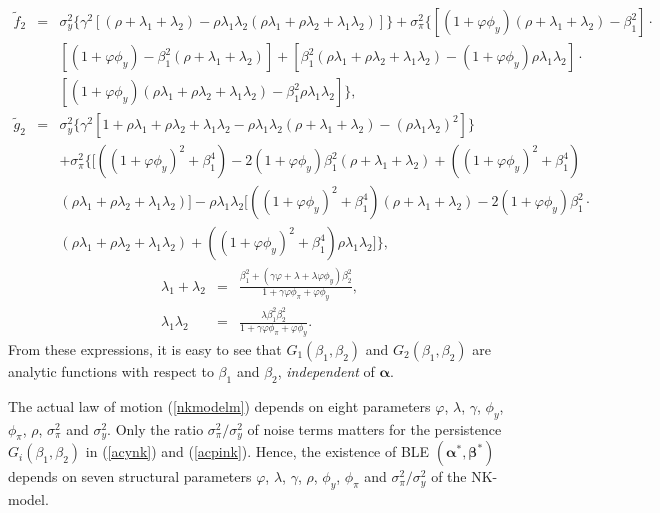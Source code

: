 \begin{eqnarray}
\widetilde{f}_2&=&\sigma_y^2\Big\{\gamma^2[(\rho+\lambda_1+\lambda_2)-\rho\lambda_1\lambda_2(\rho\lambda_1+\rho\lambda_2+\lambda_1\lambda_2)]\Big\}+\sigma_{\pi}^2\Big\{[(1+\varphi\phi_y)(\rho+\lambda_1+\lambda_2)-\beta_1^2]\cdot\nonumber\\
&&[(1+\varphi\phi_y)-\beta_1^2(\rho+\lambda_1+\lambda_2)]+[\beta_1^2(\rho\lambda_1+\rho\lambda_2+\lambda_1\lambda_2)-(1+\varphi\phi_y)\rho\lambda_1\lambda_2]\cdot\nonumber\\
&&[(1+\varphi\phi_y)(\rho\lambda_1+\rho\lambda_2+\lambda_1\lambda_2)-\beta_1^2\rho\lambda_1\lambda_2]\Big\},\nonumber\\
\widetilde{g}_2&=&\sigma_y^2\Big\{\gamma^2[1+\rho\lambda_1+\rho\lambda_2+\lambda_1\lambda_2-\rho\lambda_1\lambda_2(\rho+\lambda_1+\lambda_2)-(\rho\lambda_1\lambda_2)^2]\Big\}\nonumber\\
&&+\sigma_{\pi}^2\Big\{[((1+\varphi\phi_y)^2+\beta_1^4)-2(1+\varphi\phi_y)\beta_1^2(\rho+\lambda_1+\lambda_2)+((1+\varphi\phi_y)^2+\beta_1^4)\nonumber\\
&&(\rho\lambda_1+\rho\lambda_2+\lambda_1\lambda_2)]-\rho\lambda_1\lambda_2[((1+\varphi\phi_y)^2+\beta_1^4)(\rho+\lambda_1+\lambda_2)-2(1+\varphi\phi_y)\beta_1^2\cdot\nonumber\\
&&(\rho\lambda_1+\rho\lambda_2+\lambda_1\lambda_2)+((1+\varphi\phi_y)^2+\beta_1^4)\rho\lambda_1\lambda_2]\Big\},\label{gpivar}
\end{eqnarray}
\begin{eqnarray}
\lambda_1+\lambda_2&=&\frac{\beta_1^2+(\gamma\varphi+\lambda+\lambda\varphi\phi_y)\beta_2^2}{1+\gamma\varphi\phi_\pi+\varphi\phi_y},\label{lambdatr}\\
\lambda_1\lambda_2&=&\frac{\lambda\beta_1^2\beta_2^2}{1+\gamma\varphi\phi_\pi+\varphi\phi_y}.\label{lambdade}
\end{eqnarray}
From these expressions, it is easy to see that  $G_{1}(\beta_1,\beta_2)$ and $G_{2}(\beta_1,\beta_2)$ are analytic functions with respect
to $\beta_1$ and $\beta_2$, {\it independent} of $\pmb\alpha$.

The actual law of motion (\ref{nkmodelm}) depends on eight parameters
$\varphi$, $\lambda$, $\gamma$, $\phi_y$, $\phi_{\pi}$, $\rho$,
$\sigma^{2}_{\pi}$ and $\sigma^2_y$. Only the ratio $\sigma^2_{\pi} /
\sigma^2_{y}$ of noise terms matters for the persistence
$G_{i}(\beta_1, \beta_2)$ in (\ref{acynk}) and (\ref{acpink}).
Hence, the existence of BLE $(\pmb\alpha^*,\pmb\beta^*)$ depends on
seven structural parameters $\varphi$, $\lambda$, $\gamma$, $\rho$, $\phi_y$,
$\phi_{\pi}$ and $\sigma^2_{\pi}/\sigma^2_y$ of the NK-model.


